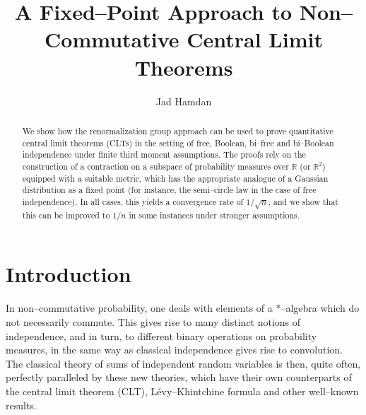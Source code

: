 \documentclass{amsart}
\theoremstyle{definition}
\theoremstyle{remark}
\numberwithin{equation}{section}
\begin{document}
\title{A Fixed--Point Approach to Non--Commutative Central Limit Theorems}
\author{Jad Hamdan}
\address{Mathematical Institute, University of Oxford}



\begin{abstract}
We show how the renormalization group approach can be used to prove quantitative central limit theorems (CLTs) in the setting of free, Boolean, bi--free and bi--Boolean independence under finite third moment assumptions. The proofs rely on the construction of a contraction on a subspace of probability measures over $\mathbb{R}$ (or $\mathbb{R}^2$) equipped with a suitable metric, which has the appropriate analogue of a Gaussian distribution as a fixed point (for instance, the semi--circle law in the case of free independence).  In all cases, this yields a convergence rate of $1/\sqrt{n}$, and we show that this can be improved to $1/n$ in some instances under stronger assumptions.
\end{abstract}

\maketitle

\section{Introduction}

In non--commutative probability, one deals with elements of a $*$--algebra which do not necessarily commute. This gives rise to many distinct notions of independence, and in turn, to different binary operations on probability measures, in the same way as classical independence gives rise to convolution. The classical theory of sums of independent random variables is then, quite often, perfectly paralleled by these new theories, which have their own counterparts of the central limit theorem (CLT), L{\'e}vy--Khintchine formula and other well--known results. 
\end{document}
